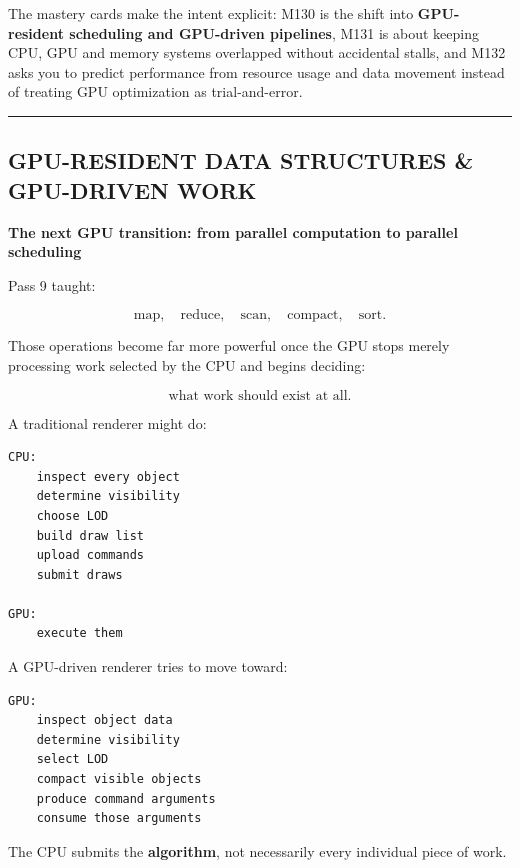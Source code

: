 The mastery cards make the intent explicit: M130 is the shift into \textbf{GPU-resident scheduling and GPU-driven pipelines}, M131 is about keeping CPU, GPU and memory systems overlapped without accidental stalls, and M132 asks you to predict performance from resource usage and data movement instead of treating GPU optimization as trial-and-error.

\begin{center}\rule{0.5\linewidth}{0.5pt}\end{center}

\subsection{GPU-RESIDENT DATA STRUCTURES \& GPU-DRIVEN WORK}\label{01-foundations-i-ch011-gpu-resident-data-structures-gpu-driven-work}

\hypertarget{01-foundations-i-ch011-gpu-resident-data-structures-gpu-driven-work}{}

\textbf{The next GPU transition: from parallel computation to parallel scheduling}

Pass 9 taught:

\[
\text{map},
\quad
\text{reduce},
\quad
\text{scan},
\quad
\text{compact},
\quad
\text{sort}.
\]

Those operations become far more powerful once the GPU stops merely processing work selected by the CPU and begins deciding:

\[
\boxed{
\text{what work should exist at all}.
}
\]

A traditional renderer might do:

\protect{}\label{p10-cpu-driven}%
\begin{verbatim}
CPU:
    inspect every object
    determine visibility
    choose LOD
    build draw list
    upload commands
    submit draws

GPU:
    execute them
\end{verbatim}

A GPU-driven renderer tries to move toward:

\protect{}\label{p10-gpu-driven}%
\begin{verbatim}
GPU:
    inspect object data
    determine visibility
    select LOD
    compact visible objects
    produce command arguments
    consume those arguments
\end{verbatim}

The CPU submits the \textbf{algorithm}, not necessarily every individual piece of work.

